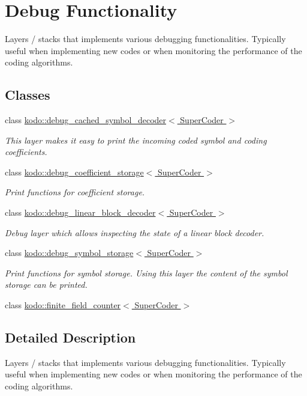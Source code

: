\hypertarget{group__debug}{\section{Debug Functionality}
\label{group__debug}
}


Layers / stacks that implements various debugging functionalities. Typically useful when implementing new codes or when monitoring the performance of the coding algorithms.  


\subsection*{Classes}
\begin{DoxyCompactItemize}
\item 
class \hyperlink{classkodo_1_1debug__cached__symbol__decoder}{kodo\-::debug\-\_\-cached\-\_\-symbol\-\_\-decoder$<$ Super\-Coder $>$}
\begin{DoxyCompactList}\small\item\em This layer makes it easy to print the incoming coded symbol and coding coefficients. \end{DoxyCompactList}\item 
class \hyperlink{classkodo_1_1debug__coefficient__storage}{kodo\-::debug\-\_\-coefficient\-\_\-storage$<$ Super\-Coder $>$}
\begin{DoxyCompactList}\small\item\em Print functions for coefficient storage. \end{DoxyCompactList}\item 
class \hyperlink{classkodo_1_1debug__linear__block__decoder}{kodo\-::debug\-\_\-linear\-\_\-block\-\_\-decoder$<$ Super\-Coder $>$}
\begin{DoxyCompactList}\small\item\em Debug layer which allows inspecting the state of a linear block decoder. \end{DoxyCompactList}\item 
class \hyperlink{classkodo_1_1debug__symbol__storage}{kodo\-::debug\-\_\-symbol\-\_\-storage$<$ Super\-Coder $>$}
\begin{DoxyCompactList}\small\item\em Print functions for symbol storage. Using this layer the content of the symbol storage can be printed. \end{DoxyCompactList}\item 
class \hyperlink{classkodo_1_1finite__field__counter}{kodo\-::finite\-\_\-field\-\_\-counter$<$ Super\-Coder $>$}
\end{DoxyCompactItemize}


\subsection{Detailed Description}
Layers / stacks that implements various debugging functionalities. Typically useful when implementing new codes or when monitoring the performance of the coding algorithms. 